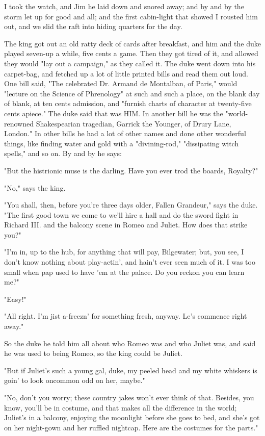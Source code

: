 I took the watch, and Jim he laid down and snored away; and by and by the
storm let up for good and all; and the first cabin-light that showed I
rousted him out, and we slid the raft into hiding quarters for the day.

The king got out an old ratty deck of cards after breakfast, and him and
the duke played seven-up a while, five cents a game.  Then they got tired
of it, and allowed they would "lay out a campaign," as they called it.
The duke went down into his carpet-bag, and fetched up a lot of little
printed bills and read them out loud.  One bill said, "The celebrated Dr.
Armand de Montalban, of Paris," would "lecture on the Science of
Phrenology" at such and such a place, on the blank day of blank, at ten
cents admission, and "furnish charts of character at twenty-five cents
apiece."  The duke said that was HIM.  In another bill he was the
"world-renowned Shakespearian tragedian, Garrick the Younger, of Drury
Lane, London."  In other bills he had a lot of other names and done other
wonderful things, like finding water and gold with a "divining-rod,"
"dissipating witch spells," and so on.  By and by he says:

"But the histrionic muse is the darling.  Have you ever trod the boards,
Royalty?"

"No," says the king.

"You shall, then, before you're three days older, Fallen Grandeur," says
the duke.  "The first good town we come to we'll hire a hall and do the
sword fight in Richard III. and the balcony scene in Romeo and Juliet.
How does that strike you?"

"I'm in, up to the hub, for anything that will pay, Bilgewater; but, you
see, I don't know nothing about play-actin', and hain't ever seen much of
it.  I was too small when pap used to have 'em at the palace.  Do you
reckon you can learn me?"

"Easy!"

"All right.  I'm jist a-freezn' for something fresh, anyway.  Le's
commence right away."

So the duke he told him all about who Romeo was and who Juliet was, and
said he was used to being Romeo, so the king could be Juliet.

"But if Juliet's such a young gal, duke, my peeled head and my white
whiskers is goin' to look oncommon odd on her, maybe."

"No, don't you worry; these country jakes won't ever think of that.
Besides, you know, you'll be in costume, and that makes all the
difference in the world; Juliet's in a balcony, enjoying the moonlight
before she goes to bed, and she's got on her night-gown and her ruffled
nightcap.  Here are the costumes for the parts."

